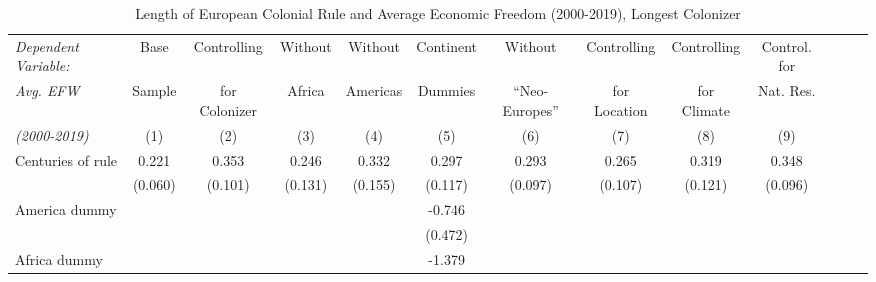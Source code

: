 \begin{sidewaystable}[h!]
\begin{threeparttable}
\begin{center}
\begin{minipage}{\textwidth}
\small
\caption{Length of European Colonial Rule and Average Economic Freedom (2000-2019), Longest Colonizer}
\label{tab:TabB4}
\begin{tabular*}{\textwidth}{@{\extracolsep{\fill}}lcccccccccccc@{\extracolsep{\fill}}}
\hline\hline
            \textit{Dependent Variable:}&\multicolumn{1}{c}{Base}&\multicolumn{1}{c}{Controlling}&\multicolumn{1}{c}{Without}&\multicolumn{1}{c}{Without}&\multicolumn{1}{c}{Continent}&\multicolumn{1}{c}{Without}&\multicolumn{1}{c}{Controlling}&\multicolumn{1}{c}{Controlling}&\multicolumn{1}{c}{Control. for}\\
            \textit{Avg. EFW}&\multicolumn{1}{c}{Sample}&\multicolumn{1}{c}{for Colonizer}&\multicolumn{1}{c}{Africa}&\multicolumn{1}{c}{Americas}&\multicolumn{1}{c}{Dummies}&\multicolumn{1}{c}{``Neo-Europes''}&\multicolumn{1}{c}{for Location}&\multicolumn{1}{c}{for Climate}&\multicolumn{1}{c}{Nat. Res.}\\
            \textit{(2000-2019)}&\multicolumn{1}{c}{(1)}&\multicolumn{1}{c}{(2)}&\multicolumn{1}{c}{(3)}&\multicolumn{1}{c}{(4)}&\multicolumn{1}{c}{(5)}&\multicolumn{1}{c}{(6)}&\multicolumn{1}{c}{(7)}&\multicolumn{1}{c}{(8)}&\multicolumn{1}{c}{(9)}\\
\hline
Centuries of rule &       0.221\sym{***} &       0.353\sym{***} &       0.246\sym{*}  &       0.332\sym{**} &       0.297\sym{**} &       0.293\sym{***}&       0.265\sym{**} &       0.319\sym{**} &       0.348\sym{***}\\
            &    (0.060)         &     (0.101)         &     (0.131)         &     (0.155)         &     (0.117)         &    (0.097)         &     (0.107)         &     (0.121)         &    (0.096)         \\
[0.125em]
America dummy     &                     &                     &                     &                     &      -0.746         &                     &                     &                     &                     \\
            &                     &                     &                     &                     &     (0.472)         &                     &                     &                     &                     \\
[0.125em]
Africa dummy      &                     &                     &                     &                     &      -1.379\sym{***}&                     &                     &                     &                     \\

\end{tabular*}
\end{minipage}
\end{center}
\end{threeparttable}
\end{sidewaystable}
